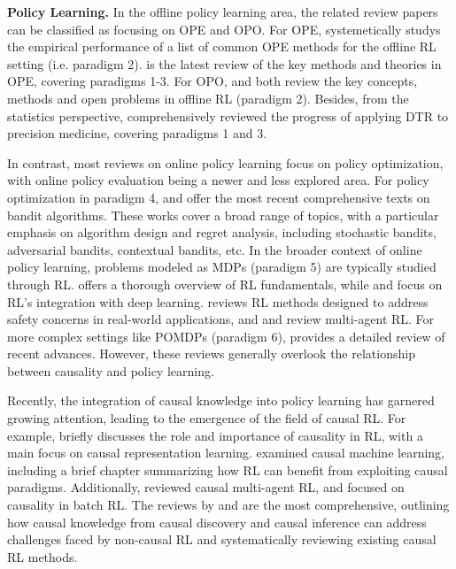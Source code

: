 \noindent 
\textbf{Policy Learning.} In the offline policy learning area, the related review papers can be classified as focusing on \acrfull{OPE} and \acrfull{OPO}.
For \acrshort{OPE}, 
\citet{voloshin2019empirical} systemetically studys the empirical performance of a list of common \acrshort{OPE} methods for the offline \acrfull{RL} setting (i.e. paradigm 2). 
\citet{uehara2022review} is the latest review of the key methods and theories in \acrshort{OPE}, covering paradigms 1-3. For \acrshort{OPO}, \citet{prudencio2023survey} and  \citet{Sergey2020offlineRL} both review the key concepts, methods and open problems in offline \acrshort{RL} (paradigm 2). Besides, from the statistics perspective, \citet{kosorok2019precision} comprehensively reviewed the progress of applying \acrshort{DTR} to precision medicine, covering paradigms 1 and 3. 

In contrast, most reviews on online policy learning focus on policy optimization, with online policy evaluation being a newer and less explored area. For policy optimization in paradigm 4, \citet{lattimore2020bandit} and \citet{slivkins2024introductionmultiarmedbandits} offer the most recent comprehensive texts on bandit algorithms. These works cover a broad range of topics, with a particular emphasis on algorithm design and regret analysis, including stochastic bandits, adversarial bandits, contextual bandits, etc.  
In the broader context of online policy learning, problems modeled as \acrshort{MDP}s (paradigm 5) are typically studied through \acrshort{RL}. \citet{shakya2023reinforcement} offers a thorough overview of \acrshort{RL} fundamentals, while \citet{wang2022deep} and \citet{arulkumaran2017brief} focus on RL's integration with deep learning. \citet{gu2022review} reviews \acrshort{RL} methods designed to address safety concerns in real-world applications, and \citet{canese2021multi} and \citet{gronauer2022multi} review multi-agent RL. For more complex settings like \acrshort{POMDP}s (paradigm 6), \citet{xiang2021recent} provides a detailed review of recent advances. However, these reviews generally overlook the relationship between causality and policy learning.

Recently, the integration of causal knowledge into policy learning has garnered growing attention, leading to the emergence of the field of causal \acrshort{RL}. For example, \citet{scholkopf2021toward} briefly discusses the role and importance of causality in \acrshort{RL}, with a main focus on causal representation learning. \citet{kaddour2022causal} examined causal machine learning, including a brief chapter summarizing how \acrshort{RL} can benefit from exploiting causal paradigms. Additionally, \citet{grimbly2021causal} reviewed causal multi-agent \acrshort{RL}, and \citet{bannon2020causality} focused on causality in batch \acrshort{RL}. The reviews by \citet{zeng2023survey} and \citet{deng2023causal} are the most comprehensive, outlining how causal knowledge from causal discovery and causal inference can address challenges faced by non-causal \acrshort{RL} and systematically reviewing existing causal \acrshort{RL} methods.

